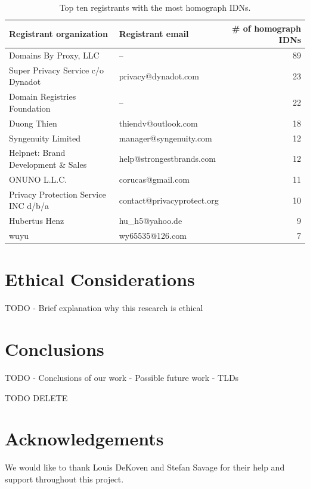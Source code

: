 \documentclass[letterpaper,twocolumn,10pt]{article}
\begin{document}
\begin{table}[]
\centering
\begin{tabular}{llr}
\hline
Registrant organization              & Registrant email           & \# of homograph IDNs \\ \hline
Domains By Proxy, LLC                & --                         & 89                   \\
Super Privacy Service c/o Dynadot    & privacy@dynadot.com        & 23                   \\
Domain Registries Foundation         & --                         & 22                   \\
Duong Thien                          & thiendv@outlook.com        & 18                   \\
Syngenuity Limited                   & manager@syngenuity.com     & 12                   \\
Helpnet: Brand Development \& Sales  & help@strongestbrands.com   & 12                   \\
ONUNO L.L.C.                         & corucas@gmail.com          & 11                   \\
Privacy Protection Service INC d/b/a & contact@privacyprotect.org & 10                   \\
Hubertus Henz                        & hu\_h5@yahoo.de            & 9                    \\
wuyu                                 & wy65535@126.com            & 7                    \\ \hline
\end{tabular}
\caption{Top ten registrants with the most homograph IDNs.}
\label{top-registrants-homograph-idns}
\end{table}

\section{Ethical Considerations}
TODO
- Brief explanation why this research is ethical

\section{Conclusions}
TODO
- Conclusions of our work
- Possible future work
- TLDs

TODO DELETE~\cite{ipv4sta}

\section*{Acknowledgements}
We would like to thank Louis DeKoven and Stefan Savage for their help and support throughout this project.

{\footnotesize 
}
\end{document}
